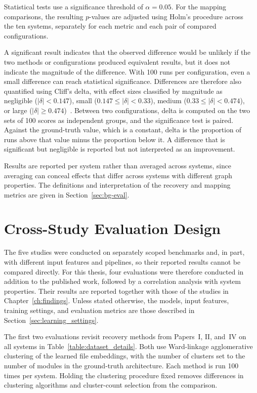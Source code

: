 Statistical tests use a significance threshold of $\alpha = 0.05$. For the mapping comparisons, the resulting $p$-values are adjusted using Holm's procedure across the ten systems, separately for each metric and each pair of compared configurations.

A significant result indicates that the observed difference would be unlikely if the two methods or configurations produced equivalent results, but it does not indicate the magnitude of the difference. With 100 runs per configuration, even a small difference can reach statistical significance. Differences are therefore also quantified using Cliff's delta, with effect sizes classified by magnitude as negligible ($|\delta| < 0.147$), small ($0.147 \leq |\delta| < 0.33$), medium ($0.33 \leq |\delta| < 0.474$), or large ($|\delta| \geq 0.474$)~\cite{cliff,romano2006}. Between two configurations, delta is computed on the two sets of 100 scores as independent groups, and the significance test is paired. Against the ground-truth value, which is a constant, delta is the proportion of runs above that value minus the proportion below it. A difference that is significant but negligible is reported but not interpreted as an improvement.

Results are reported per system rather than averaged across systems, since averaging can conceal effects that differ across systems with different graph properties. The definitions and interpretation of the recovery and mapping metrics are given in Section~\ref{sec:bg-eval}.

\section{Cross-Study Evaluation Design\label{sec:cross_study_eval}}
The five studies were conducted on separately scoped benchmarks and, in part, with different input features and pipelines, so their reported results cannot be compared directly. For this thesis, four evaluations were therefore conducted in addition to the published work, followed by a correlation analysis with system properties. Their results are reported together with those of the studies in Chapter~\ref{ch:findings}. Unless stated otherwise, the models, input features, training settings, and evaluation metrics are those described in Section~\ref{sec:learning_settings}.
 
The first two evaluations revisit recovery methods from Papers~I, II, and~IV on all systems in Table~\ref{table:dataset_details}. Both use Ward-linkage agglomerative clustering of the learned file embeddings, with the number of clusters set to the number of modules in the ground-truth architecture. Each method is run 100 times per system. Holding the clustering procedure fixed removes differences in clustering algorithms and cluster-count selection from the comparison.
 
